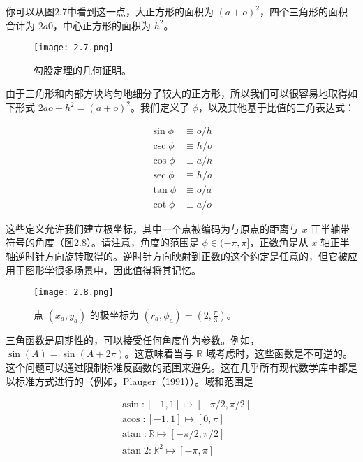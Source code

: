 \documentclass[lang=cn,10pt]{elegantbook}
\begin{document}
你可以从图2.7中看到这一点，大正方形的面积为 $(a+o)^2$，四个三角形的面积合计为 $2a0$，中心正方形的面积为 $h^2$。


\begin{figure}[htbp]
\centering
\texttt{[image: 2.7.png]}
\caption{勾股定理的几何证明。}
\end{figure}

由于三角形和内部方块均匀地细分了较大的正方形，所以我们可以很容易地取得如下形式 $2ao+h^2=(a+o)^2$。我们定义了 $\phi$，以及其他基于比值的三角表达式：

$$
\begin{aligned}
\sin \phi & \equiv o / h \\
\csc \phi & \equiv h / o \\
\cos \phi & \equiv a / h \\
\sec \phi & \equiv h / a \\
\tan \phi & \equiv o / a \\
\cot \phi & \equiv a / o
\end{aligned}
$$

这些定义允许我们建立极坐标，其中一个点被编码为与原点的距离与 $x$ 正半轴带符号的角度（图2.8）。请注意，角度的范围是 $\phi\in(-\pi,\pi]$，正数角是从 $x$ 轴正半轴逆时针方向旋转取得的。逆时针方向映射到正数的这个约定是任意的，但它被应用于图形学很多场景中，因此值得将其记忆。

\begin{figure}[htbp]
\centering
\texttt{[image: 2.8.png]}
\caption{点 $(x_a,y_a)$ 的极坐标为 $(r_a,\phi_a)=(2,\frac{\pi}{3})$。}
\end{figure}

三角函数是周期性的，可以接受任何角度作为参数。例如，$\sin(A) = \sin(A + 2\pi)$。这意味着当与 $\mathbb{R}$ 域考虑时，这些函数是不可逆的。这个问题可以通过限制标准反函数的范围来避免。这在几乎所有现代数学库中都是以标准方式进行的（例如，Plauger（1991））。域和范围是

\begin{equation}
\begin{aligned}
&\operatorname{asin}:[-1,1] \mapsto[-\pi / 2, \pi / 2] \\
&\operatorname{acos}:[-1,1] \mapsto[0, \pi] \\
&\operatorname{atan}: \mathbb{R} \mapsto[-\pi / 2, \pi / 2] \\
&\operatorname{atan} 2: \mathbb{R}^{2} \mapsto[-\pi, \pi]
\end{aligned}
\end{equation}
\end{document}
